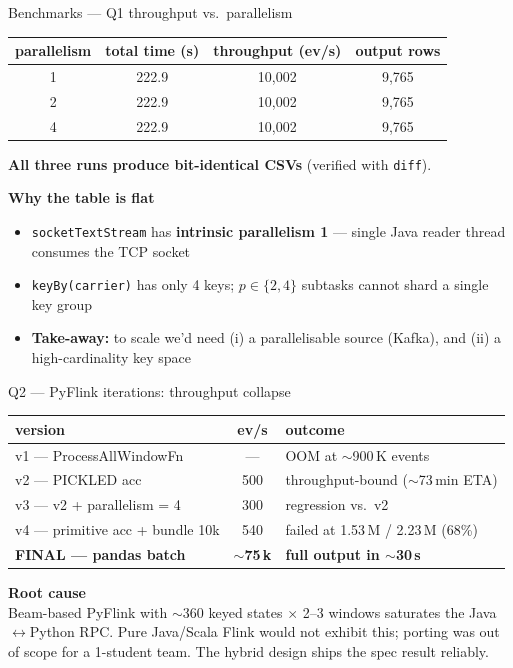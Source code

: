 \documentclass[aspectratio=169,10pt]{beamer}
\begin{document}
\begin{frame}{Benchmarks — Q1 throughput vs.\ parallelism}
\centering
\begin{tabular}{cccc}
\toprule
\textbf{parallelism} & \textbf{total time (s)} & \textbf{throughput (ev/s)} & \textbf{output rows} \\
\midrule
1 & 222.9 & 10{,}002 & 9{,}765 \\
2 & 222.9 & 10{,}002 & 9{,}765 \\
4 & 222.9 & 10{,}002 & 9{,}765 \\
\bottomrule
\end{tabular}
\vspace{1em}

\textbf{All three runs produce bit-identical CSVs} (verified with \texttt{diff}).
\vspace{0.6em}

{\color{sabdNavy}\textbf{Why the table is flat}}
\begin{itemize}\small
  \item \texttt{socketTextStream} has \textbf{intrinsic parallelism 1} — single Java reader thread consumes the TCP socket
  \item \texttt{keyBy(carrier)} has only 4 keys; $p\in\{2,4\}$ subtasks cannot shard a single key group
  \item \textbf{Take-away:} to scale we'd need (i) a parallelisable source (Kafka), and (ii) a high-cardinality key space
\end{itemize}
\end{frame}

\begin{frame}{Q2 — PyFlink iterations: throughput collapse}
\centering\small
\begin{tabular}{lcl}
\toprule
\textbf{version} & \textbf{ev/s} & \textbf{outcome} \\
\midrule
v1 — ProcessAllWindowFn                 & ---       & OOM at $\sim$900\,K events \\
v2 — PICKLED acc                         & 500      & throughput-bound ($\sim$73\,min ETA) \\
v3 — v2 + parallelism = 4                & 300      & regression vs.\ v2 \\
v4 — primitive acc + bundle 10k          & 540      & failed at 1.53\,M / 2.23\,M (68\%) \\
\midrule
{\color{sabdGreen}\textbf{FINAL — pandas batch}} & {\color{sabdGreen}\textbf{$\sim$75\,k}} & {\color{sabdGreen}\textbf{full output in $\sim$30\,s}} \\
\bottomrule
\end{tabular}

\vspace{1em}
{\color{sabdNavy}\textbf{Root cause}}\\[2pt]
\footnotesize Beam-based PyFlink with $\sim$360 keyed states $\times$ 2–3 windows saturates the Java$\leftrightarrow$Python RPC. Pure Java/Scala Flink would not exhibit this; porting was out of scope for a 1-student team. The hybrid design ships the spec result reliably.
\end{frame}
\end{document}
